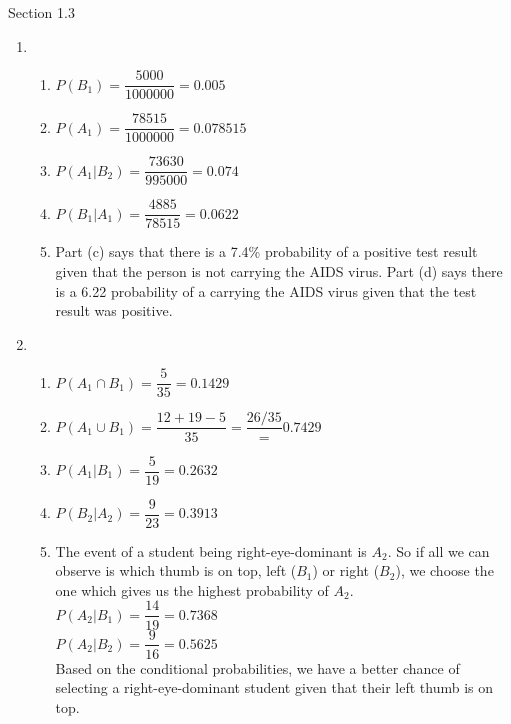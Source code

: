 \documentclass{article}
\begin{document}
      
      Section 1.3
      \begin{enumerate}
	\item 
	  \begin{enumerate}
	    \item $P(B_1) = \dfrac{5000}{1000000} = 0.005$
	    \item $P(A_1) = \dfrac{78515}{1000000} = 0.078515$
	    \item $P(A_1 | B_2) = \dfrac{73630}{995000} = 0.074$
	    \item $P(B_1 | A_1) = \dfrac{4885}{78515} = 0.0622$
	    \item 
	      Part (c) says that there is a 7.4\% probability of a positive test result given
	      that the person is not carrying the AIDS virus. Part (d) says there is a 6.22%
	      probability of a carrying the AIDS virus given that the test result was positive. 
	  \end{enumerate}
	  \addtocounter{enumi}{1}
  
	\item
	  \begin{enumerate}
	    \item $P(A_1 \cap B_1) = \dfrac{5}{35} = 0.1429$
	    \item $P(A_1 \cup B_1) = \dfrac{12 + 19 - 5}{35} = \dfrac{26/35} = 0.7429$
	    \item $P(A_1 | B_1) = \dfrac{5}{19} = 0.2632$
	    \item $P(B_2 | A_2) = \dfrac{9}{23} = 0.3913$
	    \item
	      The event of a student being right-eye-dominant is $A_2$. So if all we can observe
	      is which thumb is on top, left ($B_1$) or right ($B_2$), we choose the one which
	      gives us the highest probability of $A_2$.
	      $P(A_2 | B_1) = \dfrac{14}{19} = 0.7368$ \\
	      $P(A_2 | B_2) = \dfrac{9}{16} = 0.5625$ \\
	      
	      Based on the conditional probabilities, we have a better chance of selecting a 
	      right-eye-dominant student given that their left thumb is on top. 
	  \end{enumerate}


\end{enumerate}
\end{document}
